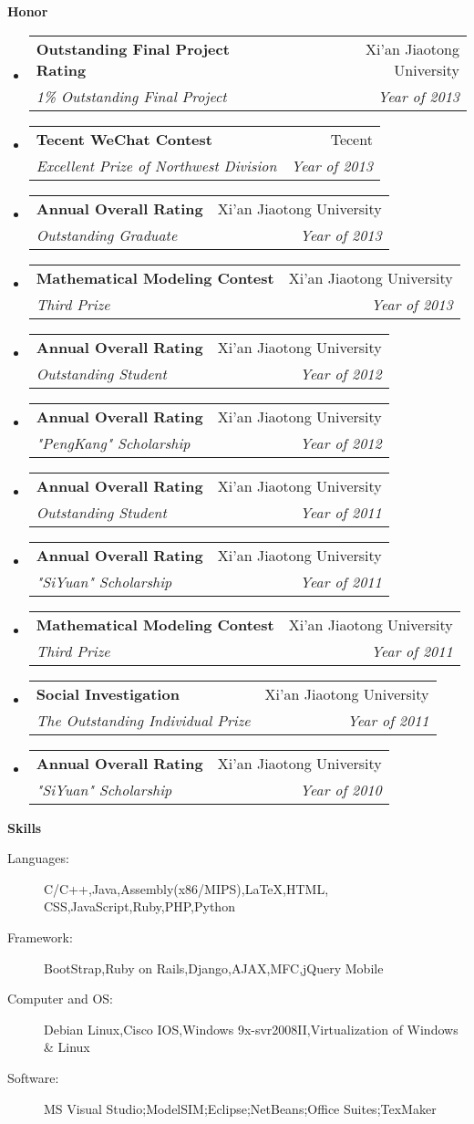 \documentclass[letterpaper,11pt]{article}
\makeatletter
\newcommand{\resheading}[1]{{\large \colorbox{mygrey}{\begin{minipage}{\textwidth}{\textbf{#1 \vphantom{p\^{E}}}}\end{minipage}}}}
\newcommand{\ressubheading}[4]{
\begin{tabular*}{6.5in}{l@{\extracolsep{\fill}}r}
		\textbf{#1} & #2 \\
		\textit{#3} & \textit{#4} \\
\end{tabular*}\vspace{-6pt}}
\makeatother
\begin{document}
\resheading{Honor}
	\begin{itemize}
		\item
			\ressubheading{Outstanding Final Project Rating}{Xi'an Jiaotong University}{1\% Outstanding Final Project}{Year of 2013}
		\item
			\ressubheading{Tecent WeChat Contest}{Tecent}{Excellent Prize of Northwest Division}{Year of 2013}
		\item
			\ressubheading{Annual Overall Rating}{Xi'an Jiaotong University}{Outstanding Graduate}{Year of 2013}
		\item
			\ressubheading{Mathematical Modeling Contest}{Xi'an Jiaotong University}{Third Prize}{Year of 2013}
		\item
			\ressubheading{Annual Overall Rating}{Xi'an Jiaotong University}{Outstanding Student}{Year of 2012}
		\item
			\ressubheading{Annual Overall Rating}{Xi'an Jiaotong University}{"PengKang" Scholarship}{Year of 2012}
		\item
			\ressubheading{Annual Overall Rating}{Xi'an Jiaotong University}{Outstanding Student}{Year of 2011}
		\item
			\ressubheading{Annual Overall Rating}{Xi'an Jiaotong University}{"SiYuan" Scholarship}{Year of 2011}
		\item
			\ressubheading{Mathematical Modeling Contest}{Xi'an Jiaotong University}{Third Prize}{Year of 2011}
		\item
			\ressubheading{Social Investigation}{Xi'an Jiaotong University}{The Outstanding Individual Prize}{Year of 2011}
		\item
			\ressubheading{Annual Overall Rating}{Xi'an Jiaotong University}{"SiYuan" Scholarship}{Year of 2010}
		\end{itemize}
	

	

\resheading{Skills}
	\begin{description}
		\item[Languages:] { \footnotesize C/C++,Java,Assembly(x86/MIPS),LaTeX,HTML, CSS,JavaScript,Ruby,PHP,Python}
		\item[Framework:] { \footnotesize BootStrap,Ruby on Rails,Django,AJAX,MFC,jQuery Mobile}
		\item[Computer and OS:] { \footnotesize Debian Linux,Cisco IOS,Windows 9x-svr2008II,Virtualization of Windows \& Linux}
		\item[Software:]{\footnotesize {MS Visual Studio};{ModelSIM};{Eclipse};{NetBeans};{Office Suites};{TexMaker}}  
	\end{description} %
\end{document}
